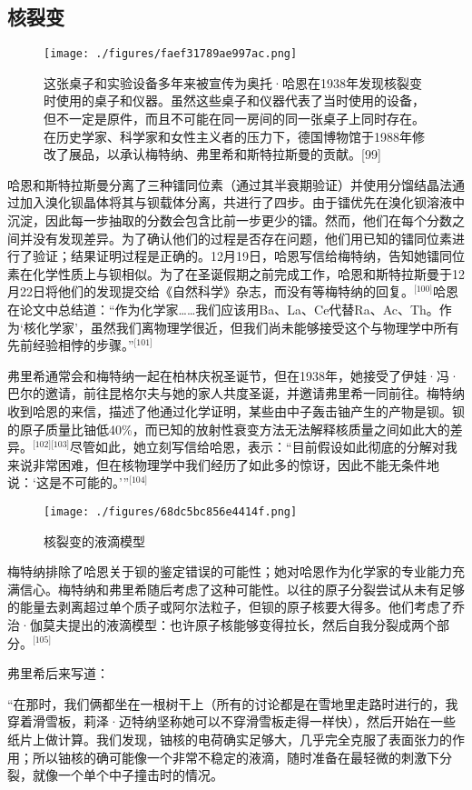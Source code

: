 \subsection{核裂变}
\begin{figure}[ht]
\centering
\texttt{[image: ./figures/faef31789ae997ac.png]}
\caption{这张桌子和实验设备多年来被宣传为奥托·哈恩在1938年发现核裂变时使用的桌子和仪器。虽然这些桌子和仪器代表了当时使用的设备，但不一定是原件，而且不可能在同一房间的同一张桌子上同时存在。在历史学家、科学家和女性主义者的压力下，德国博物馆于1988年修改了展品，以承认梅特纳、弗里希和斯特拉斯曼的贡献。[99]} \label{fig_LZm_10}
\end{figure}
哈恩和斯特拉斯曼分离了三种镭同位素（通过其半衰期验证）并使用分馏结晶法通过加入溴化钡晶体将其与钡载体分离，共进行了四步。由于镭优先在溴化钡溶液中沉淀，因此每一步抽取的分数会包含比前一步更少的镭。然而，他们在每个分数之间并没有发现差异。为了确认他们的过程是否存在问题，他们用已知的镭同位素进行了验证；结果证明过程是正确的。12月19日，哈恩写信给梅特纳，告知她镭同位素在化学性质上与钡相似。为了在圣诞假期之前完成工作，哈恩和斯特拉斯曼于12月22日将他们的发现提交给《自然科学》杂志，而没有等梅特纳的回复。\(^\text{[100]}\)哈恩在论文中总结道：“作为化学家……我们应该用Ba、La、Ce代替Ra、Ac、Th。作为‘核化学家’，虽然我们离物理学很近，但我们尚未能够接受这个与物理学中所有先前经验相悖的步骤。”\(^\text{[101]}\)

弗里希通常会和梅特纳一起在柏林庆祝圣诞节，但在1938年，她接受了伊娃·冯·巴尔的邀请，前往昆格尔夫与她的家人共度圣诞，并邀请弗里希一同前往。梅特纳收到哈恩的来信，描述了他通过化学证明，某些由中子轰击铀产生的产物是钡。钡的原子质量比铀低40\%，而已知的放射性衰变方法无法解释核质量之间如此大的差异。\(^\text{[102][103]}\)尽管如此，她立刻写信给哈恩，表示：“目前假设如此彻底的分解对我来说非常困难，但在核物理学中我们经历了如此多的惊讶，因此不能无条件地说：‘这是不可能的。’”\(^\text{[104]}\)
\begin{figure}[ht]
\centering
\texttt{[image: ./figures/68dc5bc856e4414f.png]}
\caption{核裂变的液滴模型} \label{fig_LZm_11}
\end{figure}
梅特纳排除了哈恩关于钡的鉴定错误的可能性；她对哈恩作为化学家的专业能力充满信心。梅特纳和弗里希随后考虑了这种可能性。以往的原子分裂尝试从未有足够的能量去剥离超过单个质子或阿尔法粒子，但钡的原子核要大得多。他们考虑了乔治·伽莫夫提出的液滴模型：也许原子核能够变得拉长，然后自我分裂成两个部分。\(^\text{[105]}\)

弗里希后来写道：

“在那时，我们俩都坐在一根树干上（所有的讨论都是在雪地里走路时进行的，我穿着滑雪板，莉泽·迈特纳坚称她可以不穿滑雪板走得一样快），然后开始在一些纸片上做计算。我们发现，铀核的电荷确实足够大，几乎完全克服了表面张力的作用；所以铀核的确可能像一个非常不稳定的液滴，随时准备在最轻微的刺激下分裂，就像一个单个中子撞击时的情况。

